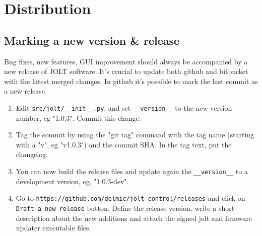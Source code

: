 \documentclass[]{article}
\begin{document}
\section{Distribution}

\subsection{Marking a new version & release}

Bug fixes, new features, GUI improvement should always be accompanied by a new release of JOLT software. It's crucial to update both github and bitbucket with the latest merged changes.
In github it's possible to mark the last commit as a new release.
\begin{enumerate}
    \item Edit \texttt{src/jolt/\_\_init\_\_.py}, and set \texttt{\_\_version\_\_} to the new version number, eg "1.0.3".
    Commit this change.
    \item Tag the commit by using the "git tag" command with the tag name (starting with a "v", eg "v1.0.3") and the commit SHA.
    In the tag text, put the changelog.
    \item You can now build the release files and update again the \texttt{\_\_version\_\_} to a development version,
    eg, "1.0.3-dev".
    \item Go to \texttt{https://github.com/delmic/jolt-control/releases} and click on \texttt{Draft a new release} button.
    Define the release version, write a short description about the new additions and attach the signed jolt and firmware updater executable files.
\end{enumerate}
\end{document}
